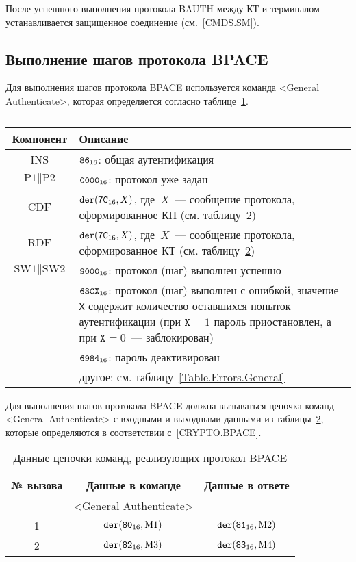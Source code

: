 После успешного выполнения протокола BAUTH между КТ и терминалом 
устанавливается защищенное соединение (см.~\ref{CMDS.SM}).

\subsection{Выполнение шагов протокола BPACE}
\label{Oper.Descr.GABPACE} 

Для выполнения шагов протокола BPACE 
используется команда <General Authenticate>,
которая определяется согласно 
таблице~\ref{Table.Oper.GABPACECmd}.

\begin{table}[hbt]
\caption{}\label{Table.Oper.GABPACECmd}
\begin{tabular}{|c|p{14cm}|}
\hline
Компонент & 	Описание \\
\hline
\hline
INS & $\texttt{86}_{16}$: общая аутентификация \\
\hline
$\text{P1} \parallel \text{P2}$ & $\texttt{0000}_{16}$: протокол уже задан\\ 
\hline
CDF & $\texttt{der}(\texttt{7C}_{16}, X)$, 
где~$X$~--- сообщение протокола, сформированное КП (см. таблицу~\ref{Table.Oper.BPACE})\\
\hline 
RDF & $\texttt{der}(\texttt{7C}_{16}, X)$, где~$X$~--- 
сообщение протокола, сформированное КТ (см. таблицу~\ref{Table.Oper.BPACE})\\
\hline
$\text{SW1} \parallel \text{SW2}$ & 
  $\texttt{9000}_{16}$: протокол (шаг) выполнен успешно \\
  & $\texttt{63CX}_{16}$: протокол (шаг) выполнен с ошибкой, 
значение \texttt{X} содержит количество оставшихся попыток аутентификации 
(при $\texttt{X} = 1$ пароль приостановлен, а при $\texttt{X} = 0$~--- 
заблокирован) \\
  & $\texttt{6984}_{16}$: пароль деактивирован \\
  & другое: см. таблицу~\ref{Table.Errors.General} \\
\hline
\end{tabular}
\end{table}

Для выполнения шагов протокола BPACE должна вызываться цепочка 
команд <General Authenticate> с входными и выходными данными 
из таблицы~\ref{Table.Oper.BPACE}, 
которые определяются в соответствии с~\ref{CRYPTO.BPACE}. 

\begin{table}[hbt]
\caption{Данные цепочки команд, реализующих протокол BPACE}
\label{Table.Oper.BPACE}
\begin{tabular}{|c|c|c|}
\hline
№ вызова & Данные в команде & Данные в ответе\\
\hline
\hline
 & <General Authenticate> &  \\
\hline
\hline
1 & $\texttt{der}(\texttt{80}_{16}, \text{M1})$ & 
$\texttt{der}(\texttt{81}_{16}, \text{M2})$\\
\hline
2 & $\texttt{der}(\texttt{82}_{16}, \text{M3})$ & 
$\texttt{der}(\texttt{83}_{16}, \text{M4})$\\
\hline
\end{tabular}
\end{table}

